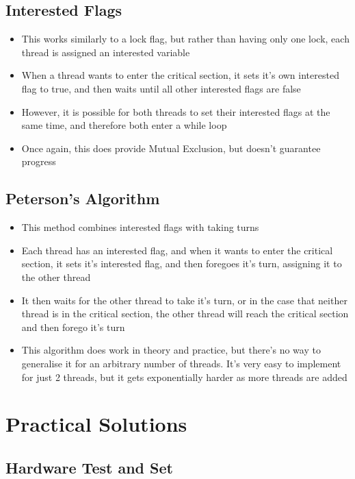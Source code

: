\subsection*{Interested Flags}

\begin{itemize}
  \item This works similarly to a lock flag, but rather than having only one lock, each thread is assigned an interested variable
  \item When a thread wants to enter the critical section, it sets it's own interested flag to true, and then waits until all other interested flags are false
  \item However, it is possible for both threads to set their interested flags at the same time, and therefore both enter a while loop
  \item Once again, this does provide Mutual Exclusion, but doesn't guarantee progress
\end{itemize}

\subsection*{Peterson's Algorithm}

\begin{itemize}
  \item This method combines interested flags with taking turns
  \item Each thread has an interested flag, and when it wants to enter the critical section, it sets it's interested flag, and then foregoes it's turn, assigning it to the other thread
  \item It then waits for the other thread to take it's turn, or in the case that neither thread is in the critical section, the other thread will reach the critical section and then forego it's turn
  \item This algorithm does work in theory and practice, but there's no way to generalise it for an arbitrary number of threads. It's very easy to implement for just 2 threads, but it gets exponentially harder as more threads are added
\end{itemize}

\section*{Practical Solutions}

\subsection*{Hardware Test and Set}

